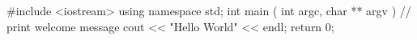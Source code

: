 #include <iostream>
using namespace std;
int
main ( int argc, char ** argv )
{
	// print welcome message
	cout << "Hello World" << endl;
	return 0;
}
